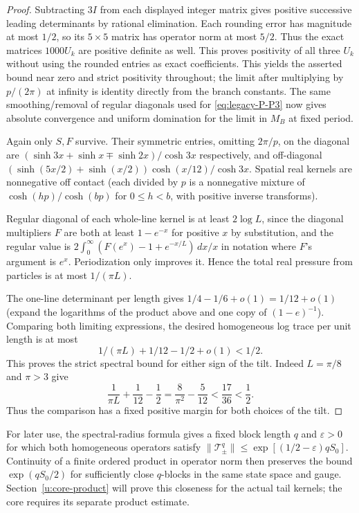 \begin{proof}
Subtracting \(3I\) from each displayed integer matrix gives positive
successive leading determinants by rational elimination.  Each rounding
error has magnitude at most $1/2$, so its $5\times5$ matrix has operator
norm at most $5/2$.  Thus the exact matrices $1000U_k$ are positive
definite as well.  This proves positivity of all three $U_k$ without
using the rounded entries as exact coefficients. This yields the asserted bound near zero and strict positivity throughout; the limit after multiplying by \(p/(2\pi)\) at infinity is identity directly from the branch constants. The same smoothing/removal of regular diagonals used for \eqref{eq:legacy-P-P3} now gives absolute convergence and uniform domination for the limit in \(M_B\) at fixed period.



Again only \(S,F\) survive. Their symmetric entries, omitting \(2\pi/p\), on the diagonal are
\((\sinh3x+\sinh x\mp\sinh2x)/\cosh3x\) respectively, and off-diagonal
\((\sinh(5x/2)+\sinh(x/2))\cosh(x/12)/\cosh3x\).
Spatial real kernels are nonnegative off contact (each divided by \(p\) is a nonnegative mixture of \(\cosh(h p)/\cosh(bp)\) for \(0\le h<b\), with positive inverse transforms).

Regular diagonal of each whole-line kernel is at least \(2\log L\), since the diagonal multipliers \(F\) are both at least \(1-e^{-x}\) for positive \(x\) by substitution, and the regular value is \(2\int_0^\infty(F(e^x)-1+e^{-x/L})\,dx/x\) in notation where \(F\)'s argument is \(e^x\). Periodization only improves it. Hence the total real pressure from particles is at most \(1/(\pi L)\).

The one-line determinant per length gives \(1/4-1/6+o(1)=1/12+o(1)\) (expand the logarithms of the product above and one copy of \((1-e)^{-1}\)). Comparing both limiting expressions, the desired homogeneous log trace per unit length is at most
\[
 1/(\pi L)+1/12-1/2+o(1)<1/2.
\]
This proves the strict spectral bound for either sign of the tilt.
Indeed $L=\pi/8$ and $\pi>3$ give
\[
 \frac1{\pi L}+\frac1{12}-\frac12
 =\frac8{\pi^2}-\frac5{12}
 <\frac{17}{36}<\frac12.
\]
Thus the comparison has a fixed positive margin for both choices of
the tilt.
\end{proof}

For later use, the spectral-radius formula gives a fixed block length
$q$ and $\varepsilon>0$ for which both homogeneous operators satisfy
$\|\mathcal T_\pm^q\|\le\exp[(1/2-\varepsilon)qS_0]$.
Continuity of a finite ordered product in operator norm then preserves
the bound $\exp(qS_0/2)$ for sufficiently close $q$-blocks in the same
state space and gauge.  Section~\ref{u:core-product} will prove this
closeness for the actual tail kernels; the core requires its separate
product estimate.



